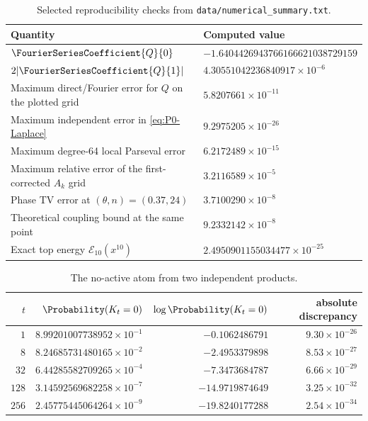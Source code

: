 \documentclass[11pt,oneside]{article}
\theoremstyle{definition}
\theoremstyle{remark}
\newcommand{\Ecal}{\mathcal E}
\begin{document}
\begin{table}[H]
\centering
\caption{Selected reproducibility checks from
\texttt{data/numerical\_summary.txt}.}
\label{tab:numerical-summary}
\begin{tabularx}{0.96\textwidth}{@{}l>{\raggedleft\arraybackslash}X@{}}
\toprule
Quantity & Computed value \\
\midrule
$\FourierSeriesCoefficient{Q}{0}$
& $-1.6404426943766166621038729159$ \\
$2|\FourierSeriesCoefficient{Q}{1}|$
& $4.30551042236840917\times10^{-6}$ \\
Maximum direct/Fourier error for $Q$ on the plotted grid
& $5.8207661\times10^{-11}$ \\
Maximum independent error in \eqref{eq:P0-Laplace}
& $9.2975205\times10^{-26}$ \\
Maximum degree-64 local Parseval error
& $6.2172489\times10^{-15}$ \\
Maximum relative error of the first-corrected $A_k$ grid
& $3.2116589\times10^{-5}$ \\
Phase TV error at $(\theta,n)=(0.37,24)$
& $3.7100290\times10^{-8}$ \\
Theoretical coupling bound at the same point
& $9.2332142\times10^{-8}$ \\
Exact top energy $\Ecal_{10}(x^{10})$
& $2.4950901155034477\times10^{-25}$ \\
\bottomrule
\end{tabularx}
\end{table}

\begin{table}[H]
\centering
\caption{The no-active atom from two independent products.}
\label{tab:no-active}
\begin{tabular}{@{}rrrr@{}}
\toprule
$t$ & $\Probability(K_t=0)$ & $\log\Probability(K_t=0)$ & absolute discrepancy \\
\midrule
$1$   & $8.99201007738952\times10^{-1}$ & $-0.1062486791$ & $9.30\times10^{-26}$ \\
$8$   & $8.24685731480165\times10^{-2}$ & $-2.4953379898$ & $8.53\times10^{-27}$ \\
$32$  & $6.44285582709265\times10^{-4}$ & $-7.3473684787$ & $6.66\times10^{-29}$ \\
$128$ & $3.14592569682258\times10^{-7}$ & $-14.9719874649$ & $3.25\times10^{-32}$ \\
$256$ & $2.45775445064264\times10^{-9}$ & $-19.8240177288$ & $2.54\times10^{-34}$ \\
\bottomrule
\end{tabular}
\end{table}
\end{document}

